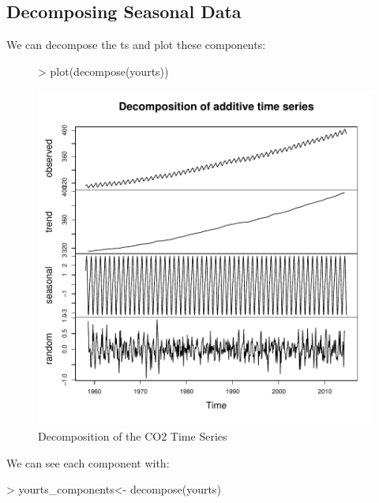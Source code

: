 \documentclass[11pt, a4paper]{article} %
\begin{document}
\subsection{Decomposing Seasonal Data}%
\noindent We can decompose the ts and plot these components:
\begin{figure}[H]
\centering
\begin{Schunk}
\begin{Sinput}
> plot(decompose(yourts))
\end{Sinput}
\end{Schunk}
\includegraphics{alleselena-decompose}
\caption{Decomposition of the CO2 Time Series}
\end{figure}


\noindent We can see each component with:
\begin{Schunk}
\begin{Sinput}
> yourts_components<- decompose(yourts)
\end{Sinput}
\end{Schunk}
\begin{Schunk}
\end{Schunk}
\end{document}
